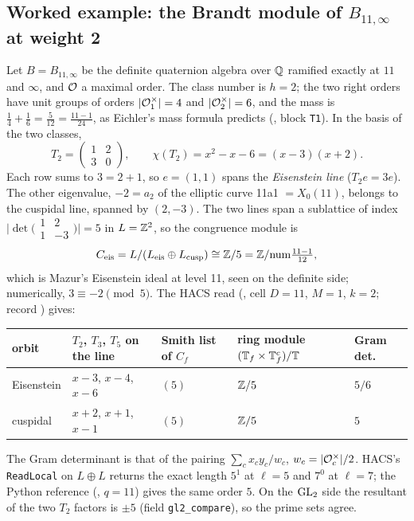 \subsection{Worked example: the Brandt module of $B_{11,\infty}$ at weight 2}\label{ss:hacs-b11}
Let $B=B_{11,\infty}$ be the definite quaternion algebra over $\mathbb{Q}$ ramified exactly at $11$ and $\infty$, and $\mathcal{O}$ a
maximal order. The class number is $h=2$; the two right orders have unit groups of orders $|\mathcal{O}_1^\times|=4$ and
$|\mathcal{O}_2^\times|=6$, and the mass is $\frac14+\frac16=\frac5{12}=\frac{11-1}{24}$, as Eichler's mass formula predicts
(, block \texttt{T1}). In the basis of the two classes,
\[
T_2=\begin{pmatrix}1&2\\3&0\end{pmatrix},\qquad \chi(T_2)=x^2-x-6=(x-3)(x+2).
\]
Each row sums to $3=2+1$, so $e=(1,1)$ spans the \emph{Eisenstein line} ($T_2e=3e$). The other eigenvalue,
$-2=a_2$ of the elliptic curve 11a1 $=X_0(11)$, belongs to the cuspidal line, spanned by $(2,-3)$. The two lines span a
sublattice of index $\bigl|\det\bigl(\begin{smallmatrix}1&2\\1&-3\end{smallmatrix}\bigr)\bigr|=5$ in $L=\mathbb{Z}^2$, so the
congruence module is
\[
C_{\rm eis}=L/(L_{\rm eis}\oplus L_{\rm cusp})\cong\mathbb{Z}/5=\mathbb{Z}/\mathrm{num}\tfrac{11-1}{12},
\]
which is Mazur's Eisenstein ideal at level 11, seen on the definite side; numerically, $3\equiv-2\pmod5$. The HACS read
(, cell $D=11$, $M=1$, $k=2$; record )
gives:
\begin{center}\small
\begin{tabular}{@{}lllll@{}}\toprule
orbit & $T_2$, $T_3$, $T_5$ on the line & Smith list of $C_f$ & ring module $(\mathbb{T}_f\times\mathbb{T}_f^c)/\mathbb{T}$ & Gram det.\\\midrule
Eisenstein & $x-3$, $x-4$, $x-6$ & $(5)$ & $\mathbb{Z}/5$ & $5/6$\\
cuspidal & $x+2$, $x+1$, $x-1$ & $(5)$ & $\mathbb{Z}/5$ & $5$\\\bottomrule
\end{tabular}
\end{center}
The Gram determinant is that of the pairing $\sum_c x_cy_c/w_c$, $w_c=|\mathcal{O}_c^\times|/2$. HACS's \texttt{ReadLocal} on
$L\oplus L$ returns the exact length $5^1$ at $\ell=5$ and $7^0$ at $\ell=7$; the Python reference
(, $q=11$) gives the same order $5$. On the $\mathrm{GL}_2$ side the resultant of the two $T_2$
factors is $\pm5$ (field \texttt{gl2\_compare}), so the prime sets agree.

